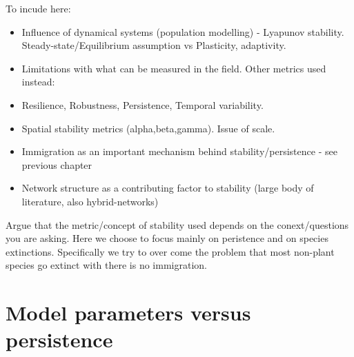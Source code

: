 To incude here:

\begin{itemize}

\item Influence of dynamical systems (population modelling) - Lyapunov stability. Steady-state/Equilibrium assumption vs Plasticity, adaptivity.

\item Limitations with what can be measured in the field. Other metrics used instead: 

\item Resilience, Robustness, Persistence, Temporal variability. 

\item Spatial stability metrics (alpha,beta,gamma). Issue of scale. 

\item Immigration as an important mechanism behind stability/persistence - see previous chapter

\item Network structure as a contributing factor to stability (large body of literature, also hybrid-networks)

\end{itemize}


Argue that the metric/concept of stability used depends on the conext/questions you are asking. Here we choose to focus mainly on peristence and on species extinctions. Specifically we try to over come the problem that most non-plant species go extinct with there is no immigration. 

%
%

\newpage
\section{Model parameters versus persistence}
\label{sec:parameters_v_stability}

